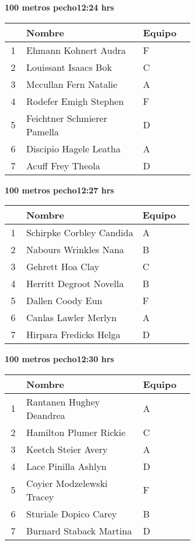 \begin{minipage}{0.95\linewidth}
\begin{center}
\textbf{
100 metros pecho\hspace{1cm}12:24 hrs}
\end{center}
\begin{tabular}{cp{0.63\linewidth}l}
\hline
& \textbf{Nombre} & \textbf{Equipo} \\ \hline
1 & Ehmann Kohnert Audra & F \\ 
2 & Louissant Isaacs Bok & C \\ 
3 & Mccullan Fern Natalie & A \\ 
4 & Rodefer Emigh Stephen & F \\ 
5 & Feichtner Schmierer Pamella & D \\ 
6 & Discipio Hagele Leatha & A \\ 
7 & Acuff Frey Theola & D \\ 
\end{tabular}
\end{minipage}
\begin{minipage}{0.95\linewidth}
\begin{center}
\textbf{
100 metros pecho\hspace{1cm}12:27 hrs}
\end{center}
\begin{tabular}{cp{0.63\linewidth}l}
\hline
& \textbf{Nombre} & \textbf{Equipo} \\ \hline
1 & Schirpke Corbley Candida & A \\ 
2 & Nabours Wrinkles Nana & B \\ 
3 & Gehrett Hoa Clay & C \\ 
4 & Herritt Degroot Novella & B \\ 
5 & Dallen Coody Eun & F \\ 
6 & Canlas Lawler Merlyn & A \\ 
7 & Hirpara Fredicks Helga & D \\ 
\end{tabular}
\end{minipage}
\begin{minipage}{0.95\linewidth}
\begin{center}
\textbf{
100 metros pecho\hspace{1cm}12:30 hrs}
\end{center}
\begin{tabular}{cp{0.63\linewidth}l}
\hline
& \textbf{Nombre} & \textbf{Equipo} \\ \hline
1 & Rantanen Hughey Deandrea & A \\ 
2 & Hamilton Plumer Rickie & C \\ 
3 & Keetch Steier Avery & A \\ 
4 & Lace Pinilla Ashlyn & D \\ 
5 & Coyier Modzelewski Tracey & F \\ 
6 & Sturiale Dopico Carey & B \\ 
7 & Burnard Staback Martina & D \\ 
\end{tabular}
\end{minipage}
